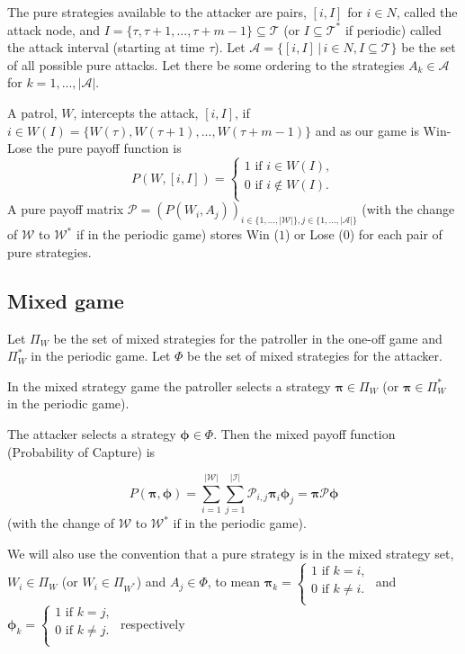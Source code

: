 \documentclass[a4paper,10pt]{article}
\theoremstyle{definition}
\theoremstyle{definition}
\theoremstyle{remark}
\theoremstyle{definition}
\begin{document}
The pure strategies available to the attacker are pairs, $[i,I]$ for $i \in N$, called the attack node, and $I=\{ \tau,\tau+1,...,\tau+m-1 \} \subseteq \mathcal{T}$ (or $I \subseteq \mathcal{T}^*$ if periodic) called the attack interval (starting at time $\tau$). Let $\mathcal{A}=\{[i,I] \, | \, i \in N , I \subseteq \mathcal{T} \}$ be the set of all possible pure attacks. Let there be some ordering to the strategies $A_{k} \in \mathcal{A}$ for $k=1,...,|\mathcal{A}|$.

A patrol, $W$, intercepts the attack, $[i,I]$, if $i \in W(I)=\{W(\tau),W(\tau+1),...,W(\tau+m-1)\}$ and as our game is Win-Lose the pure payoff function is
$$P(W,[i,I])=\left\{ \begin{array}{l}
1 \text{  if  } i \in W(I) ,\\
0 \text{  if  } i \notin W(I) .\\
\end{array}\right.$$
A pure payoff matrix $\mathcal{P}=(P(W_{i},A_{j}))_{i \in \{ 1,...,|\mathcal{W}| \}, j \in \{ 1,...,|\mathcal{A}| \}}$ (with the change of $\mathcal{W}$ to $\mathcal{W}^*$ if in the periodic game) stores Win ($1$) or Lose ($0$) for each pair of pure strategies.

\subsection{Mixed game}
Let $\Pi_{W}$ be the set of mixed strategies for the patroller in the one-off game and $\Pi_{W}^*$ in the periodic game. Let $\Phi$ be the set of mixed strategies for the attacker.

In the mixed strategy game the patroller selects a strategy $\bm{\pi} \in \Pi_{W}$ (or $\bm{\pi}  \in \Pi_{W}^*$ in the periodic game).

The attacker selects a strategy $\bm{\phi} \in \Phi$. Then the mixed payoff function (Probability of Capture) is

$$
P(\bm{\pi} ,\bm{\phi})=\sum\limits_{i=1}^{|\mathcal{W}|} \sum\limits_{j=1}^{|\mathcal{I}|} \mathcal{P}_{i,j} \bm{\pi} _{i} \bm{\phi}_{j}
=\bm{\pi} \mathcal{P} \bm{\phi}
$$
(with the change of $\mathcal{W}$ to $\mathcal{W}^*$ if in the periodic game).

We will also use the convention that a pure strategy is in the mixed strategy set, $W_{i} \in \Pi_{W}$ (or $W_{i} \in \Pi_{W^*}$) and $A_{j} \in \Phi$, to mean $\bm{\pi}_{k}=\left\{\begin{array}{c}
1 \text{ if } k=i, \\
0 \text{ if } k \neq i. \\
\end{array} \right.$
and
$\bm{\phi}_{k}=\left\{\begin{array}{c}
1 \text{ if } k=j, \\
0 \text{ if } k \neq j. \\
\end{array} \right.$ respectively
\end{document}
